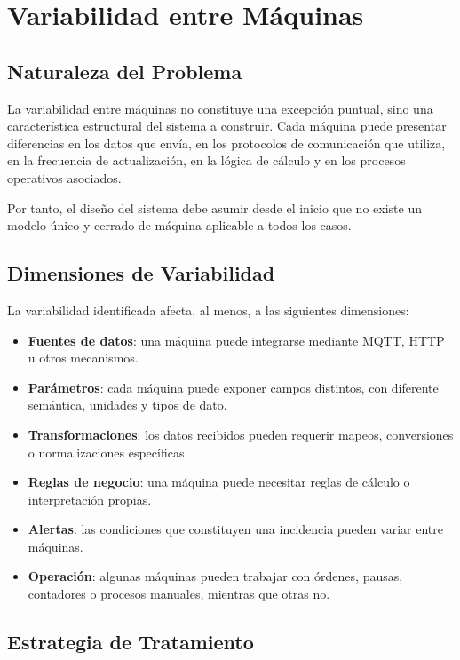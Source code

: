 \section{Variabilidad entre Máquinas}

\subsection{Naturaleza del Problema}

La variabilidad entre máquinas no constituye una excepción puntual, sino una característica estructural del sistema a construir. Cada máquina puede presentar diferencias en los datos que envía, en los protocolos de comunicación que utiliza, en la frecuencia de actualización, en la lógica de cálculo y en los procesos operativos asociados.

Por tanto, el diseño del sistema debe asumir desde el inicio que no existe un modelo único y cerrado de máquina aplicable a todos los casos.

\subsection{Dimensiones de Variabilidad}

La variabilidad identificada afecta, al menos, a las siguientes dimensiones:

\begin{itemize}
    \item \textbf{Fuentes de datos}: una máquina puede integrarse mediante MQTT, HTTP u otros mecanismos.
    \item \textbf{Parámetros}: cada máquina puede exponer campos distintos, con diferente semántica, unidades y tipos de dato.
    \item \textbf{Transformaciones}: los datos recibidos pueden requerir mapeos, conversiones o normalizaciones específicas.
    \item \textbf{Reglas de negocio}: una máquina puede necesitar reglas de cálculo o interpretación propias.
    \item \textbf{Alertas}: las condiciones que constituyen una incidencia pueden variar entre máquinas.
    \item \textbf{Operación}: algunas máquinas pueden trabajar con órdenes, pausas, contadores o procesos manuales, mientras que otras no.
\end{itemize}

\subsection{Estrategia de Tratamiento}

